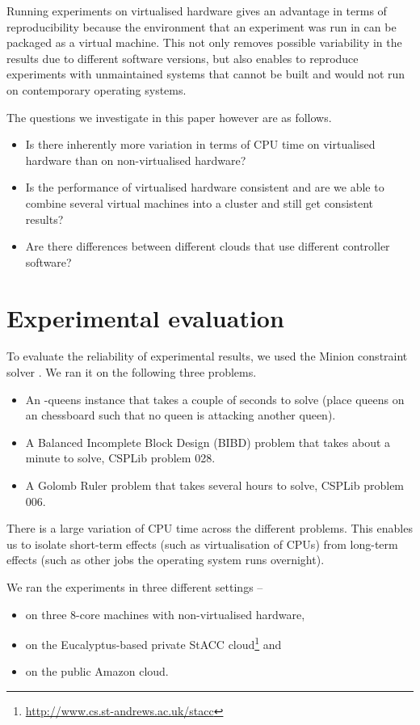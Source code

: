 \documentclass{llncs}
\begin{document}
Running experiments on virtualised hardware gives an advantage in terms of
reproducibility because the environment that an experiment was run in can be
packaged as a virtual machine. This not only removes possible variability in the
results due to different software versions, but also enables to reproduce
experiments with unmaintained systems that cannot be built and would not run on
contemporary operating systems.

The questions we investigate in this paper however are as follows.
\begin{itemize}
\item Is there inherently more variation in terms of CPU time on virtualised
    hardware than on non-virtualised hardware?
\item Is the performance of virtualised hardware consistent and are we able to
    combine several virtual machines into a cluster and still get consistent
    results?
\item Are there differences between different clouds that use different
    controller software?
\end{itemize}




\section{Experimental evaluation}

To evaluate the reliability of experimental results, we used the Minion
constraint solver \citep{minion}. We ran it on the following three problems.
\begin{itemize}
\item An -queens instance that takes a couple of seconds to solve (place 
    queens on an  chessboard such that no queen is attacking another
    queen).
\item A Balanced Incomplete Block Design (BIBD) problem that takes about a
    minute to solve, CSPLib \citep{csplib} problem 028.
\item A Golomb Ruler problem that takes several hours to solve, CSPLib problem
    006.
\end{itemize}

There is a large variation of CPU time across the different problems. This
enables us to isolate short-term effects (such as virtualisation of CPUs) from
long-term effects (such as other jobs the operating system runs overnight).

We ran the experiments in three different settings --
\begin{itemize}
\item on three 8-core machines with non-virtualised hardware,
\item on the Eucalyptus-based private StACC
    cloud\footnote{\url{http://www.cs.st-andrews.ac.uk/stacc}} and
\item on the public Amazon cloud.
\end{itemize}
\end{document}
